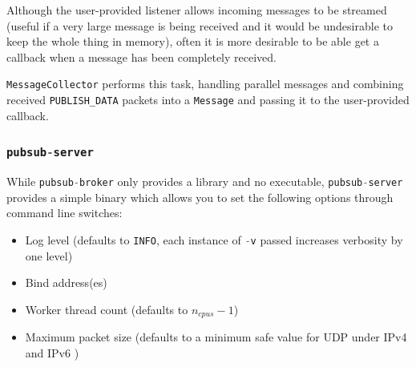 \documentclass[a4paper]{article}
\numberwithin{figure}{section}
\numberwithin{table}{section}
\newcommand{\mi}{\mintinline}
\begin{document}
\medskip
\noindent Although the user-provided listener allows incoming messages to be streamed (useful if a very large message is being received and it would be undesirable to keep the whole thing in memory), often it is more desirable to be able get a callback when a message has been completely received.

\mi{rust}{MessageCollector} performs this task, handling parallel messages and combining received \mi{c}{PUBLISH_DATA} packets into a \mi{rust}{Message} and passing it to the user-provided callback.

\subsubsection{\mi{c}{pubsub-server}}
While \mi{c}{pubsub-broker} only provides a library and no executable, \mi{c}{pubsub-server} provides a simple binary which allows you to set the following options through command line switches:
\begin{itemize}
	\item Log level (defaults to \mi{c}{INFO}, each instance of \mi{c}{-v} passed increases verbosity by one level)
	\item Bind address(es)
	\item Worker thread count (defaults to $n_{cpus} - 1$)
	\item Maximum packet size (defaults to a minimum safe value for UDP under IPv4 and IPv6 \cite{udp-safe})
\end{itemize}
\end{document}
